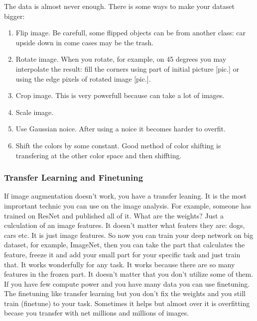 The data is almost never enough. There is some ways to make your dataset bigger:
\begin{enumerate}[label=$\bullet$]
  \item Flip image. Be carefull, some flipped objects can be from another class: car upside down in come cases may be the trash.
  \item Rotate image. When you rotate, for example, on 45 degrees you may interpolate the result: fill the corners using part of initial picture [pic.] or using the edge pixels of rotated image [pic.]. 
  \item Crop image. This is very powerfull because can take a lot of images.
  \item Scale image.
  \item Use Gaussian noice. After using a noice it becomes harder to overfit.
  \item Shift the colors by some constant. Good method of color shifting is transfering at the other color space and then shiffting.
\end{enumerate}

\subsubsection*{Transfer Learning and Finetuning}

If image augmentation doesn't work, you have a transfer leaning. It is the most imprortant technic you can use on the image analysis. For example, someone has trained on ResNet and published all of it. What are the weights? Just a culculation of an image features. It doesn't matter what featers they are: dogs, cars etc. It is just image features. So now you can train your deep network on big dataset, for example, ImageNet, then you can take the part that calculates the feature, freeze it and add your small part for your specific task and just train that. It works wonderfully for any task. It works because there are so many features in the frozen part. It doesn't matter that you don't utilize some of them.\\
If you have few compute power and you have many data you can use finetuning. The finetuning like transfer learning but you don't fix the weights and you still train (finetune) to your task. Sometimes it helps but almost over it is overfitting becase you transfer with net millions and millions of images.